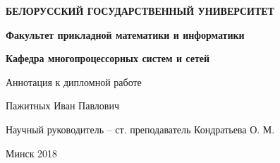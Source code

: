 \documentclass[main.tex]{subfiles}
\begin{document}
\begin{titlepage}
    \begin{center}
         \textbf{БЕЛОРУССКИЙ ГОСУДАРСТВЕННЫЙ УНИВЕРСИТЕТ}
    \end{center}
    \begin{center}
         \textbf{Факультет прикладной математики и информатики}
    \end{center}
    \begin{center}
        \textbf{Кафедра многопроцессорных систем и сетей}
    \end{center}

    \vspace{6em}
    
    \begin{center}
        Аннотация к дипломной работе
    \end{center}
    
    \begin{center}
        \textbf{}
    \end{center}

    \vspace{1em}

    \begin{center}
        Пажитных Иван Павлович
    \end{center}

    \vspace{6em}

    \begin{center}
        Научный руководитель -- ст. преподаватель Кондратьева О. М.
    \end{center}

    \vfill

    \begin{center}
        Минск 2018
    \end{center}
\end{titlepage}
\newpage
\setcounter{page}{2}

\end{document}
